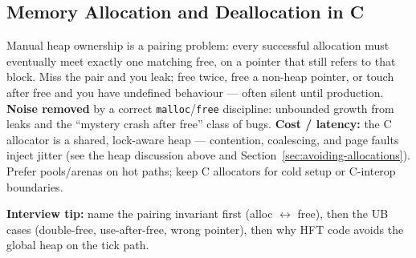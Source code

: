 \newpage
\subsection{Memory Allocation and Deallocation in C}
Manual heap ownership is a pairing problem: every successful allocation must 
eventually meet exactly one matching free, on a pointer that still refers to 
that block. Miss the pair and you leak; free twice, free a non-heap pointer, 
or touch after free and you have undefined behaviour --- often silent until 
production.
\newline
\textbf{Noise removed} by a correct \texttt{malloc}/\texttt{free} discipline: 
unbounded growth from leaks and the ``mystery crash after free'' class of bugs. 
\textbf{Cost / latency:} the C allocator is a shared, lock-aware heap --- 
contention, coalescing, and page faults inject jitter (see the heap discussion 
above and Section~\ref{sec:avoiding-allocations}). Prefer pools/arenas on hot 
paths; keep C allocators for cold setup or C-interop boundaries.
\par\noindent\textbf{Interview tip:} name the pairing invariant first 
(alloc $\leftrightarrow$ free), then the UB cases (double-free, use-after-free, 
wrong pointer), then why HFT code avoids the global heap on the tick path.
